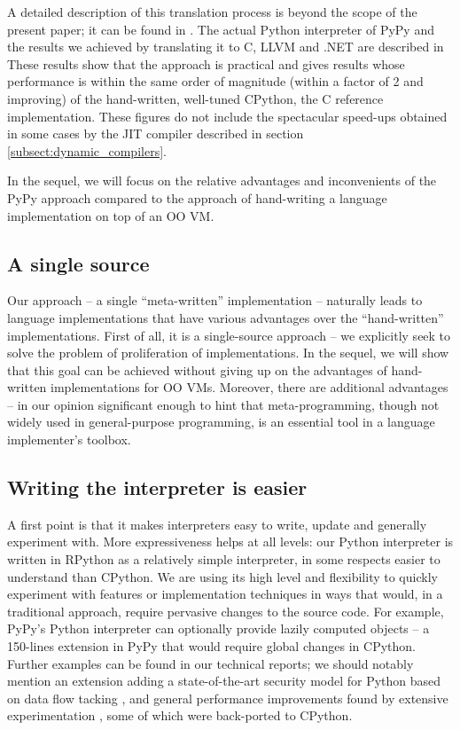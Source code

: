 \documentclass{llncs}
\begin{document}
A detailed description of this translation process is beyond the scope of the
present paper; it can be found in \cite{pypyvmconstruction}.  The actual Python
interpreter of PyPy and the results we achieved by translating it to C, LLVM
\cite{LLVM} and .NET are described in \cite{architecture} \cite{translationdoc}
These results show that the
approach is practical and gives results whose performance is within the same
order of magnitude (within a factor of 2 and improving) of the hand-written,
well-tuned CPython, the C reference implementation.  These figures do not
include the spectacular speed-ups obtained in some cases by the JIT compiler
described in section \ref{subsect:dynamic_compilers}.

In the sequel, we will focus on the relative advantages and
inconvenients of the PyPy approach compared to the approach of
hand-writing a language implementation on top of an OO VM.


\subsection{A single source}

Our approach -- a single ``meta-written'' implementation -- naturally
leads to language implementations that have various advantages over the
``hand-written'' implementations.  First of all, it is a single-source
approach -- we explicitly seek to solve the problem of proliferation of
implementations.  In the sequel, we will show that this goal can be
achieved without giving up on the advantages of hand-written
implementations for OO VMs.  Moreover, there are additional advantages
-- in our opinion significant enough to hint that meta-programming,
though not widely used in general-purpose programming, is an essential
tool in a language implementer's toolbox.

\subsection{Writing the interpreter is easier}

A first point is that it makes interpreters easy to write, update and
generally experiment with.  More expressiveness helps at all levels: our
Python interpreter is written in RPython as a relatively simple
interpreter, in some respects easier to understand than CPython.  We are
using its high level and flexibility to quickly experiment with features
or implementation techniques in ways that would, in a traditional
approach, require pervasive changes to the source code.  For example,
PyPy's Python interpreter can optionally provide lazily computed objects
-- a 150-lines extension in PyPy that would require global changes in
CPython.  Further examples can be found in our technical reports; we
should notably mention an extension adding a state-of-the-art security
model for Python based on data flow tacking \cite{D12.1}, and general
performance improvements found by extensive experimentation \cite{D06.1}, some
of which were back-ported to CPython.
\end{document}
